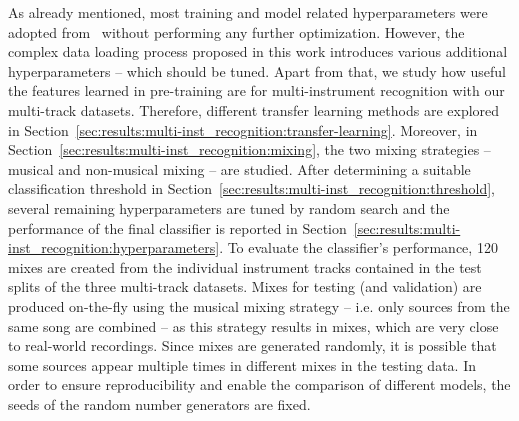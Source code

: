 As already mentioned, most training and model related hyperparameters were adopted from~\cite{won2020evaluation} without performing any further optimization. However, the complex data loading process proposed in this work introduces various additional hyperparameters -- which should be tuned. Apart from that, we study how useful the features learned in pre-training are for multi-instrument recognition with our multi-track datasets. Therefore, different transfer learning methods are explored in Section~\ref{sec:results:multi-inst_recognition:transfer-learning}. Moreover, in Section~\ref{sec:results:multi-inst_recognition:mixing}, the two mixing strategies -- musical and non-musical mixing -- are studied. After determining a suitable classification threshold in Section~\ref{sec:results:multi-inst_recognition:threshold}, several remaining hyperparameters are tuned by random search and the performance of the final classifier is reported in Section~\ref{sec:results:multi-inst_recognition:hyperparameters}. To evaluate the classifier's performance, 120 mixes are created from the individual instrument tracks contained in the test splits of the three multi-track datasets. Mixes for testing (and validation) are produced on-the-fly using the musical mixing strategy -- i.e. only sources from the same song are combined -- as this strategy results in mixes, which are very close to real-world recordings. Since mixes are generated randomly, it is possible that some sources appear multiple times in different mixes in the testing data. In order to ensure reproducibility and enable the comparison of different models, the seeds of the random number generators are fixed.\\

